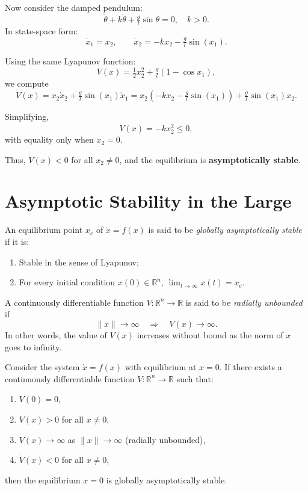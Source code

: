 \begin{example}
Now consider the damped pendulum:
\[
    \ddot{\theta} + k\dot{\theta} + \tfrac{g}{l}\sin\theta = 0, \quad k>0.
\]
In state-space form:
\[
    \dot{x}_1 = x_2, 
    \qquad 
    \dot{x}_2 = -k x_2 - \tfrac{g}{l}\sin(x_1).
\]

Using the same Lyapunov function:
\[
    V(x) = \tfrac{1}{2}x_2^2 + \tfrac{g}{l}(1-\cos x_1),
\]
we compute
\[
    \dot V(x) = x_2\dot{x}_2 + \tfrac{g}{l}\sin(x_1)\dot{x}_1
    = x_2(-k x_2 - \tfrac{g}{l}\sin(x_1)) + \tfrac{g}{l}\sin(x_1)x_2.
\]

Simplifying,
\[
    \dot V(x) = -k x_2^2 \leq 0,
\]
with equality only when $x_2=0$.  

Thus, $\dot V(x)<0$ for all $x_2 \neq 0$, and the equilibrium is \textbf{asymptotically stable}.
\end{example}

\section{Asymptotic Stability in the Large}

\begin{definition}
	An equilibrium point $x_e$ of $\dot{x}=f(x)$ is said to be \emph{globally asymptotically stable} if it is:
	\begin{enumerate}
		\item Stable in the sense of Lyapunov;
		\item For every initial condition $x(0)\in \mathbb{R}^n$, $\lim_{t\to\infty}x(t)=x_e$.
	\end{enumerate}
\end{definition}

\begin{definition}
	A continuously differentiable function $V:\mathbb{R}^n \to \mathbb{R}$ is said to be \emph{radially unbounded} if
	\begin{equation}
		\|x\| \to \infty \quad \Rightarrow \quad V(x)\to \infty.
	\end{equation}
	In other words, the value of $V(x)$ increases without bound as the norm of $x$ goes to infinity.
\end{definition}

\begin{theorem}
	Consider the system $\dot{x}=f(x)$ with equilibrium at $x=0$.  
	If there exists a continuously differentiable function $V:\mathbb{R}^n \to \mathbb{R}$ such that:
	\begin{enumerate}
		\item $V(0)=0$,
		\item $V(x)>0$ for all $x\neq 0$,
		\item $V(x)\to \infty$ as $\|x\|\to \infty$ (radially unbounded),
		\item $\dot{V}(x)<0$ for all $x\neq 0$,
	\end{enumerate}
	then the equilibrium $x=0$ is globally asymptotically stable.
\end{theorem}

